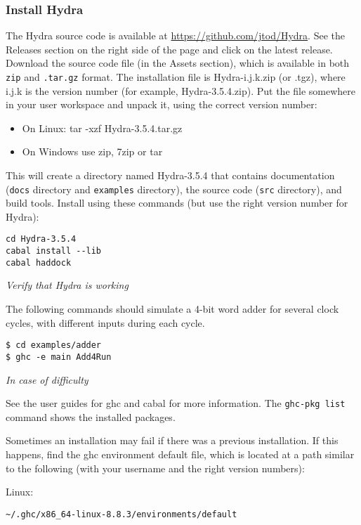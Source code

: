 \documentclass[11pt]{article}
\begin{document}
\subsubsection{Install Hydra}
\label{sec:org7178e08}

The Hydra source code is available at \url{https://github.com/jtod/Hydra}.
See the Releases section on the right side of the page and click on
the latest release.  Download the source code file (in the Assets
section), which is available in both \texttt{zip} and \texttt{.tar.gz} format.  The
installation file is Hydra-i.j.k.zip (or .tgz), where i.j.k is the
version number (for example, Hydra-3.5.4.zip).  Put the file somewhere
in your user workspace and unpack it, using the correct version
number:

\begin{itemize}
\item On Linux: tar -xzf Hydra-3.5.4.tar.gz
\item On Windows use zip, 7zip or tar
\end{itemize}

This will create a directory named Hydra-3.5.4 that contains
documentation (\texttt{docs} directory and \texttt{examples} directory), the source
code (\texttt{src} directory), and build tools.  Install using these commands
(but use the right version number for Hydra):

\begin{verbatim}
cd Hydra-3.5.4
cabal install --lib
cabal haddock
\end{verbatim}

\emph{Verify that Hydra is working}

The following commands should simulate a 4-bit word adder for several
clock cycles, with different inputs during each cycle.

\begin{verbatim}
$ cd examples/adder
$ ghc -e main Add4Run
\end{verbatim}

\emph{In case of difficulty}

See the user guides for ghc and cabal for more information.  The
\texttt{ghc-pkg list} command shows the installed packages.

Sometimes an installation may fail if there was a previous
installation.  If this happens, find the ghc environment default file,
which is located at a path similar to the following (with your
username and the right version numbers):

Linux:
\begin{verbatim}
~/.ghc/x86_64-linux-8.8.3/environments/default 
\end{verbatim}
\end{document}
